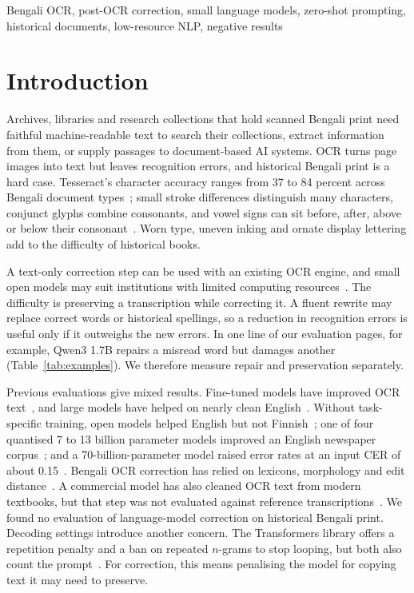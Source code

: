 \documentclass[conference]{IEEEtran}
\begin{document}
\begin{IEEEkeywords}
Bengali OCR, post-OCR correction, small language models, zero-shot prompting, historical documents, low-resource NLP, negative results
\end{IEEEkeywords}

\section{Introduction}

Archives, libraries and research collections that hold scanned Bengali print need faithful machine-readable text to search their collections, extract information from them, or supply passages to document-based AI systems. OCR turns page images into text but leaves recognition errors, and historical Bengali print is a hard case. Tesseract's character accuracy ranges from 37 to 84 percent across Bengali document types~\cite{rabby2024enhancement}; small stroke differences distinguish many characters, conjunct glyphs combine consonants, and vowel signs can sit before, after, above or below their consonant~\cite{rabby2024enhancement}. Worn type, uneven inking and ornate display lettering add to the difficulty of historical books.

A text-only correction step can be used with an existing OCR engine, and small open models may suit institutions with limited computing resources~\cite{vershinin2025lightweight}. The difficulty is preserving a transcription while correcting it. A fluent rewrite may replace correct words or historical spellings, so a reduction in recognition errors is useful only if it outweighs the new errors. In one line of our evaluation pages, for example, Qwen3 1.7B repairs a misread word but damages another (Table~\ref{tab:examples}). We therefore measure repair and preservation separately.

Previous evaluations give mixed results. Fine-tuned models have improved OCR text~\cite{thomas2024leveraging,beshirov2025bulgarian}, and large models have helped on nearly clean English~\cite{koynov2025opportunities}. Without task-specific training, open models helped English but not Finnish~\cite{kanerva2025nofreelunches}; one of four quantised 7 to 13 billion parameter models improved an English newspaper corpus~\cite{vershinin2025lightweight}; and a 70-billion-parameter model raised error rates at an input CER of about 0.15~\cite{koynov2025opportunities}. Bengali OCR correction has relied on lexicons, morphology and edit distance~\cite{pal2000ocr,ahmed2016improving}. A commercial model has also cleaned OCR text from modern textbooks, but that step was not evaluated against reference transcriptions~\cite{joy2026bnmmlu}. We found no evaluation of language-model correction on historical Bengali print. Decoding settings introduce another concern. The Transformers library offers a repetition penalty and a ban on repeated $n$-grams to stop looping, but both also count the prompt~\cite{hf2026logits}. For correction, this means penalising the model for copying text it may need to preserve.
\end{document}
